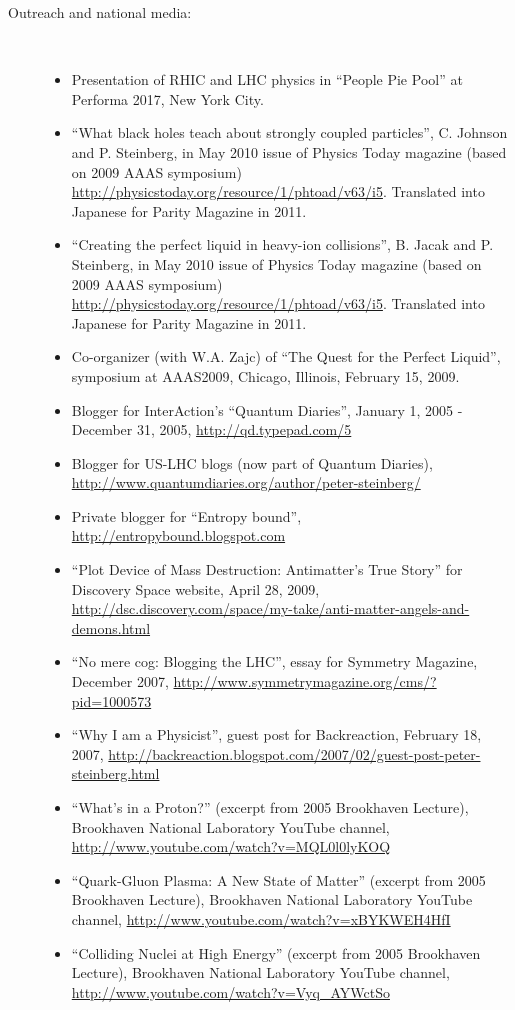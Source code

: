 \documentclass[11 pt]{article}
\begin{document}
\begin{description}
\item[Outreach and national media:]\
\begin{itemize}
\item Presentation of RHIC and LHC physics in ``People Pie Pool'' at Performa 2017, New York City.
\item ``What black holes teach about strongly coupled particles'', C. Johnson and P. Steinberg, in May 2010 issue of Physics Today magazine (based on 2009 AAAS symposium) \url{http://physicstoday.org/resource/1/phtoad/v63/i5}.  Translated into Japanese for Parity Magazine in 2011. 
\item ``Creating the perfect liquid in heavy-ion collisions'', B. Jacak and P. Steinberg, in May 2010 issue of Physics Today magazine (based on 2009 AAAS symposium) \url{http://physicstoday.org/resource/1/phtoad/v63/i5}.  Translated into Japanese for Parity Magazine in 2011. 
\item Co-organizer (with W.A. Zajc) of ``The Quest for the Perfect Liquid'', symposium at AAAS2009, Chicago, Illinois, February 15, 2009.
\item Blogger for InterAction's ``Quantum Diaries'', January 1, 2005 - December 31, 2005, \url{http://qd.typepad.com/5}
\item Blogger for US-LHC blogs (now part of Quantum Diaries), \url{http://www.quantumdiaries.org/author/peter-steinberg/}
\item Private blogger for ``Entropy bound'', \url{http://entropybound.blogspot.com}
\item ``Plot Device of Mass Destruction: Antimatter's True Story'' for Discovery Space website, April 28, 2009, \url{http://dsc.discovery.com/space/my-take/anti-matter-angels-and-demons.html}
\item ``No mere cog: Blogging the LHC'', essay for Symmetry Magazine, December 2007, \url{http://www.symmetrymagazine.org/cms/?pid=1000573}
\item ``Why I am a Physicist'', guest post for Backreaction, February 18, 2007, \url{http://backreaction.blogspot.com/2007/02/guest-post-peter-steinberg.html}
\item ``What's in a Proton?'' (excerpt from 2005 Brookhaven Lecture), Brookhaven National Laboratory YouTube channel, \url{http://www.youtube.com/watch?v=MQL0l0lyKOQ}
\item ``Quark-Gluon Plasma: A New State of Matter'' (excerpt from 2005 Brookhaven Lecture), Brookhaven National Laboratory YouTube channel, \url{http://www.youtube.com/watch?v=xBYKWEH4HfI}
\item ``Colliding Nuclei at High Energy'' (excerpt from 2005 Brookhaven Lecture), Brookhaven National Laboratory YouTube channel, \url{http://www.youtube.com/watch?v=Vyq_AYWctSo}
\end{itemize}

\end{description}
\end{document}
